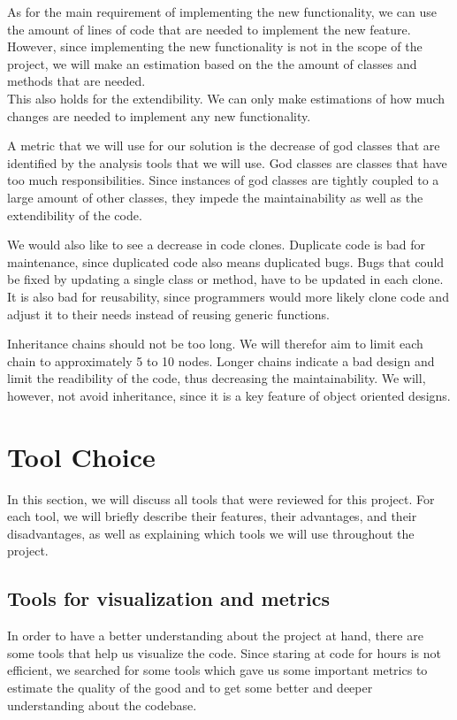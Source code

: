 \documentclass[]{article}
\begin{document}
As for the main requirement of implementing the new functionality, we can use the amount of lines of code that are needed to implement the new feature. However, since implementing the new functionality is not in the scope of the project, we will make an estimation based on the the amount of classes and methods that are needed. \\
This also holds for the extendibility. We can only make estimations of how much changes are needed to implement any new functionality. 

A metric that we will use for our solution is the decrease of god classes that are identified by the analysis tools that we will use. God classes are classes that have too much responsibilities. Since instances of god classes are tightly coupled to a large amount of other classes, they impede the maintainability as well as the extendibility of the code.

We would also like to see a decrease in code clones. Duplicate code is bad for maintenance, since duplicated code also means duplicated bugs. Bugs that could be fixed by updating a single class or method, have to be updated in each clone. It is also bad for reusability, since programmers would more likely clone code and adjust it to their needs instead of reusing generic functions. 


Inheritance chains should not be too long. We will therefor aim to limit each chain to approximately 5 to 10 nodes. Longer chains indicate a bad design and limit the readibility of the code, thus decreasing the maintainability. We will, however, not avoid inheritance, since it is a key feature of object oriented designs. 



\section{Tool Choice}

In this section, we will discuss all tools that were reviewed for this project. For each tool, we will briefly describe their features, their advantages, and their disadvantages, as well as explaining which tools we will use throughout the project. 

\subsection{Tools for visualization and metrics}
In order to have a better understanding about the project at hand, there are some tools that help us visualize the code. Since staring at code for hours is not efficient, we searched for some tools which gave us some important metrics to estimate the quality of the good and to get some better and deeper understanding about the codebase.
\end{document}
